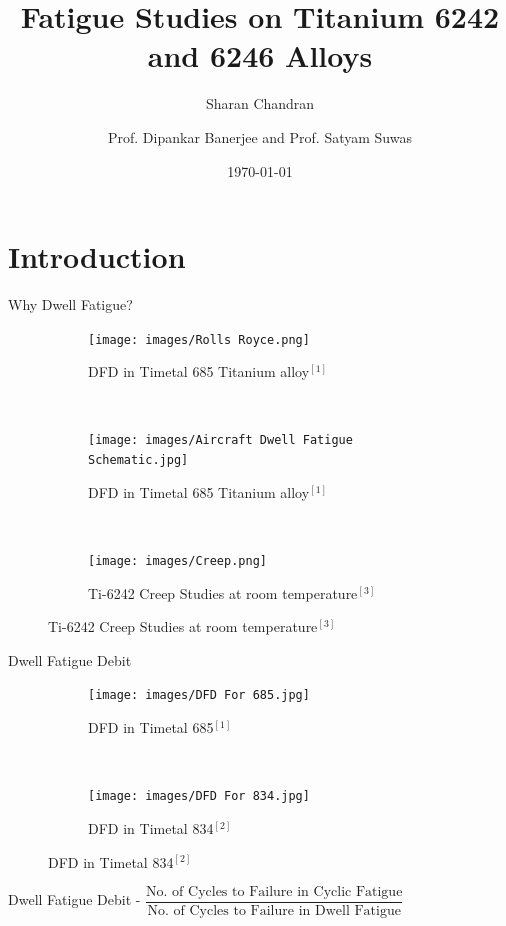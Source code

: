 \documentclass[10pt]{beamer}
\title{Fatigue Studies on Titanium 6242 and 6246 Alloys}
\subtitle{Sharan Chandran}
\date{\today}
\date{}
\author{Prof. Dipankar Banerjee and Prof. Satyam Suwas}
\institute{Indian Institute of Science}
\begin{document}

\maketitle

\section{Introduction}

{%
\begin{frame}[fragile]{Why Dwell Fatigue?}

\begin{figure}[H]
    \centering
    \begin{subfigure}{0.45\textwidth}
        \texttt{[image: images/Rolls Royce.png]}
        \caption{DFD in Timetal 685 Titanium alloy$^{[1]}$}
        \end{subfigure}
    ~
    \begin{subfigure}{0.45\textwidth}
        \texttt{[image: images/Aircraft Dwell Fatigue Schematic.jpg]}
        \caption{DFD in Timetal 685 Titanium alloy$^{[1]}$}
        \end{subfigure}  
	\\	
    \begin{subfigure}{\textwidth}
        \texttt{[image: images/Creep.png]}
        \caption{Ti-6242 Creep Studies at room temperature$^{[3]}$}
    \end{subfigure}   
\end{figure}


\end{frame}
}


{%
\begin{frame}[fragile]{Dwell Fatigue Debit}

\begin{figure}[H]
    \centering
    \begin{subfigure}{0.40\textwidth}
        \texttt{[image: images/DFD For 685.jpg]}
        \caption{DFD in Timetal 685$^{[1]}$}
        \end{subfigure}
    ~
    \begin{subfigure}{0.50\textwidth}
        \texttt{[image: images/DFD For 834.jpg]}
        \caption{DFD in Timetal 834$^{[2]}$}
    \end{subfigure}   
\end{figure}

Dwell Fatigue Debit - $ \dfrac{\text{No. of Cycles to Failure in Cyclic Fatigue}}{\text{No. of Cycles to Failure in Dwell Fatigue}} $  

\end{frame}
}
\end{document}
